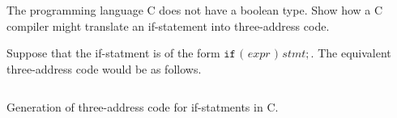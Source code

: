 \begin{exercise}\label{ex:020802}
    The programming language C does not have a boolean type. Show how a C 
    compiler might translate an if-statement into three-address code.
\end{exercise}
\begin{solution}\label{sol:020802}
    Suppose that the if-statment is of the form $\texttt{if ( } expr 
    \texttt{ ) } stmt;$. The equivalent three-address code would be as follows.
    \begin{listing}
        \inputminted[linenos=true, frame=single, breaklines=true]{java}{02/08/02/ex020802.java}
        \caption{Generation of three-address code for if-statments in C.}
        \label{code:020802}
    \end{listing}
\end{solution}